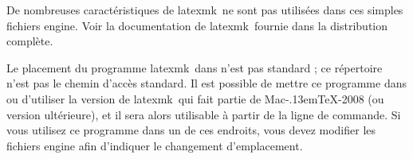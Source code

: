 \documentclass[11pt,french]{article}
\newcommand{\MacTeX}{Mac\kern-.13em\TeX}
\newcommand{\TS}{\textsf{\TeX Shop}}
\newcommand{\latexmk}{\textsf{latexmk}}
\newcommand{\mnu}[1]{\textsf{#1}}
\newcommand{\cmd}[1]{\textsf{#1}}
\begin{document}
De nombreuses caractéristiques de \latexmk\ ne sont pas utilisées dans ces simples fichiers \cmd{engine}. Voir la documentation de \latexmk\ fournie dans la distribution complète.

Le placement du programme \latexmk\ dans  n'est pas standard ; ce répertoire n'est pas le chemin d'accès standard. Il est possible de mettre ce programme dans  ou d'utiliser la version de \latexmk\ qui fait partie de \MacTeX-2008 (ou version ultérieure), et il sera alors utilisable à partir de la ligne de commande. Si vous utilisez ce programme dans un de ces endroits, vous devez modifier les fichiers \cmd{engine} afin d'indiquer le changement d'emplacement.


%

%

%
\end{document}
